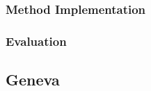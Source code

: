 \documentclass[12pt, fleqn, a4paper]{article}
\begin{document}
\subsubsection{Method Implementation}
\subsubsection{Evaluation}
%
\subsection{Geneva}
\end{document}
